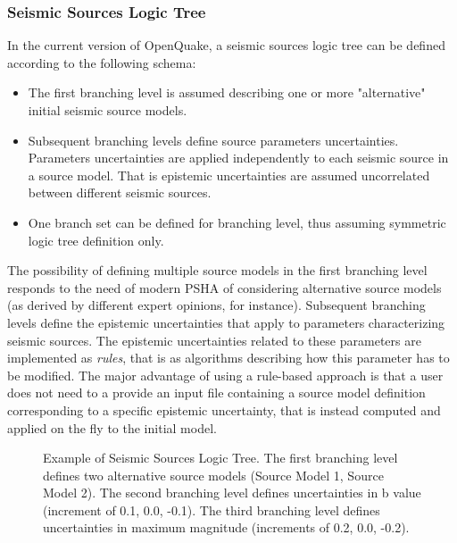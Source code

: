 \subsubsection{Seismic Sources Logic Tree}
\label{hazard:source_model_logic_tree}
%
In the current version of OpenQuake, a seismic sources logic tree can be 
defined according to the following schema:
\begin{itemize}
\item The first branching level is assumed describing one or more "alternative" 
initial seismic source models.
\item Subsequent branching levels define source parameters uncertainties. 
Parameters uncertainties are applied independently to each seismic source 
in a source model. That is epistemic uncertainties are assumed uncorrelated 
between different seismic sources.
\item One branch set can be defined for branching level, thus assuming 
symmetric logic tree definition only.
\end{itemize}
%
The possibility of defining multiple source models in the first branching 
level responds to the need of modern PSHA of considering alternative source 
models (as derived by different expert opinions, for instance). 
%
Subsequent branching levels define the epistemic uncertainties that 
apply to parameters characterizing seismic sources. The  
epistemic uncertainties related to these parameters are implemented as 
\emph{rules}, that is as algorithms describing how this parameter has to be 
modified. 
%
The major advantage of using a rule-based approach is that a user does not 
need to a provide an input file containing a source model definition 
corresponding to a specific epistemic uncertainty, that is instead computed 
and applied on the fly to the initial model.
%
\begin{figure}

\caption{Example of Seismic Sources Logic Tree. The first branching level defines
two alternative source models (Source Model 1, Source Model 2). The second 
branching level defines uncertainties in b value (increment of 0.1, 0.0, -0.1).
The third branching level defines uncertainties in maximum magnitude 
(increments of 0.2, 0.0, -0.2).}
\label{fig:SourceModelLogicTree}
\end{figure}
%
